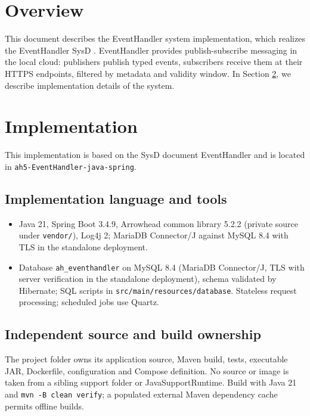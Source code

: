 \documentclass[a4paper]{arrowhead}
\begin{document}
\section{Overview}
\label{sec:overview}

This document describes the EventHandler system implementation, which realizes the EventHandler SysD \cite{eh-sysd}. EventHandler provides publish-subscribe messaging in the local cloud: publishers publish typed events, subscribers receive them at their HTTPS endpoints, filtered by metadata and validity window.
In Section \ref{Implementation}, we describe implementation details of the system.

\newpage

\section{Implementation}
\label{Implementation}

This implementation is based on the SysD document EventHandler \cite{eh-sysd} and is located in \texttt{ah5-EventHandler-java-spring}.

\subsection{Implementation language and tools}
\begin{itemize}
\item Java 21, Spring Boot 3.4.9, Arrowhead common library 5.2.2 (private source under \texttt{vendor/}), Log4j 2; MariaDB Connector/J against MySQL 8.4 with TLS in the standalone deployment.
\item Database \texttt{ah\_\allowbreak{}eventhandler} on MySQL 8.4 (MariaDB Connector/J, TLS with server verification in the standalone deployment), schema validated by Hibernate; SQL scripts in \texttt{src/\allowbreak{}main/\allowbreak{}resources/\allowbreak{}database}. Stateless request processing; scheduled jobs use Quartz.
\end{itemize}

\subsection{Independent source and build ownership}
The project folder owns its application source, Maven build, tests, executable JAR, Dockerfile, configuration and Compose definition. No source or image is taken from a sibling support folder or JavaSupportRuntime. Build with Java 21 and \texttt{mvn -B clean verify}; a populated external Maven dependency cache permits offline builds.
\end{document}

